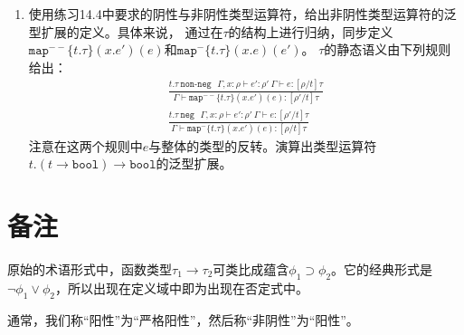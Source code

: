 \begin{enumerate}
	\item 使用练习14.4中要求的阴性与非阴性类型运算符，给出非阴性类型运算符的泛型扩展的定义。具体来说，
	通过在$\tau$的结构上进行归纳，同步定义$\texttt{map}^{--}\{t.\tau\}(x.e')(e)$和$\texttt{map}^-\{t.\tau\}(x.e)(e')$。
	$\tau$的静态语义由下列规则给出：
	\begin{subequations}
		\begin{gather}
		\frac{t.\tau\ \texttt{non-neg}\ \ \ \Gamma,x:\rho\vdash e':\rho'\ \Gamma\vdash e:[\rho/t]\tau}
		{\Gamma\vdash\texttt{map}^{--}\{t.\tau\}(x.e')(e):[\rho'/t]\tau} \\
		\frac{t.\tau\ \texttt{neg}\ \ \ \Gamma,x:\rho\vdash e':\rho'\ \Gamma\vdash e:[\rho'/t]\tau}
		{\Gamma\vdash\texttt{map}^{-}\{t.\tau\}(x.e')(e):[\rho/t]\tau} 
		\end{gather}
	\end{subequations}
	注意在这两个规则中$e$与整体的类型的反转。演算出类型运算符$t.(t\rightarrow\texttt{bool})\rightarrow\texttt{bool}$的泛型扩展。
\end{enumerate}

\section*{备注}

\noindent 原始的术语形式中，函数类型$\tau_1\rightarrow\tau_2$可类比成蕴含$\phi_1\supset\phi_2$。它的经典形式是
$\neg\phi_1\vee\phi_2$，所以出现在定义域中即为出现在否定式中。

\noindent 通常，我们称“阳性”为“严格阳性”，然后称“非阴性”为“阳性”。


